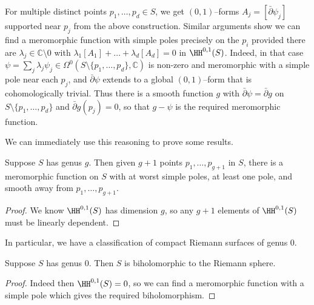 For multiple distinct points \(p_1,\ldots,p_d\in S\), we get \((0,1)\)--forms \(A_j
= [\bar\partial \psi_j]\) supported near \(p_j\) from the above construction.
Similar arguments show we can find a meromorphic function with simple poles
precisely on the \(p_i\) provided there are \(\lambda_j\in \mathbb{C}\setminus
0\) with \(\lambda_1[A_1]+\ldots+\lambda_d[A_d]=0\) in \(\HH^{0,1}(S)\). Indeed, in
that case \(\psi=\sum_j \lambda_j\psi_j \in \Omega^0(S\setminus
\{p_1,\ldots,p_d\},\mathbb{C})\) is non-zero and meromorphic with a simple pole
near each \(p_j\), and \(\bar\partial \psi\) extends to a global \((0,1)\)--form
that is cohomologically trivial. Thus there is a smooth function \(g\) with
\(\bar\partial \psi = \bar\partial g\) on \(S\setminus \{p_1,\ldots,p_d\}\) and
\(\bar\partial g  (p_j)= 0\), so that \(g-\psi\) is the required meromorphic
function.

We can immediately use this reasoning to prove some results.

\begin{corollary}
    Suppose \(S\) has genus \(g\). Then given
    \(g+1\) points \(p_1,\ldots,p_{g+1}\) in \(S\), there is a meromorphic
    function on \(S\) with at worst simple poles, at least one pole, and smooth
    away from \(p_1,\ldots,p_{g+1}\).
    \begin{proof}
        We know \(\HH^{0,1}(S)\) has dimension \(g\), so any \(g+1\) elements of
        \(\HH^{0,1}(S)\) must be linearly dependent.
    \end{proof}
\end{corollary}

In particular, we have a classification of compact Riemann surfaces of genus
\(0\).

\begin{corollary}
    Suppose \(S\) has genus \(0\). Then \(S\) is biholomorphic to the Riemann
    sphere.
    \begin{proof}
        Indeed then \(\HH^{0,1}(S)=0\), so we can find a meromorphic function
        with a simple pole which gives the required biholomorphism.
    \end{proof}
\end{corollary}

